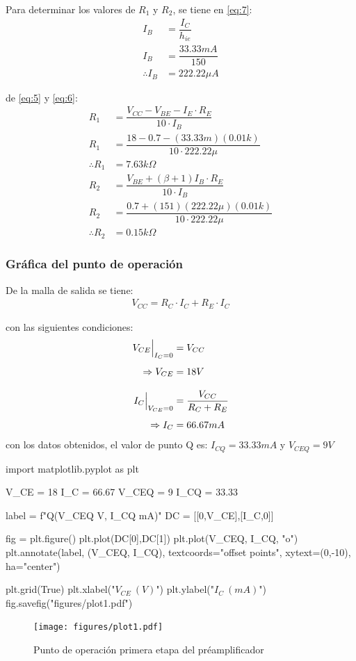 \documentclass[a4paper, 12pt]{article}
\begin{document}
Para determinar los valores de $R_1$ y $R_2$, se tiene en \eqref{eq:7}: 
\begin{align*}
    I_B &= \dfrac{I_C}{h_{ie}}\\[1.5mm]
    I_B &= \dfrac{33.33 mA}{150}\\[1.5mm] 
    \therefore I_B &= 222.22 \mu A
\end{align*}

de \eqref{eq:5} y \eqref{eq:6}:
\begin{align*}
    R_1 &= \dfrac{V_{CC} - V_{BE} -I_E\cdot R_E}{10\cdot I_B}\\[1.5mm]
    R_1 &= \dfrac{18 - 0.7 - (33.33m)(0.01k)}{10\cdot 222.22\mu}\\[1.5mm]
    \therefore R_1 &= 7.63 k\Omega \\[2mm]
    R_2 &= \dfrac{V_{BE} + (\beta + 1)I_B\cdot R_E}{10\cdot I_B}\\[1.5mm]
    R_2 &= \dfrac{0.7 + (151)(222.22\mu)(0.01k)}{10\cdot 222.22\mu}\\[1.5mm]
    \therefore R_2 &= 0.15 k\Omega
\end{align*}

\subsubsection{Gráfica del punto de operación}
De la malla de salida se tiene:
\begin{align}
    V_{CC} = R_C\cdot I_C + R_E\cdot I_C
\end{align}

con las siguientes condiciones:
\begin{align*}
    \Bigl. V_{CE}\Bigr|_{I_C=0} &= V_{CC}\\[1.5mm]
    \Rightarrow V_{CE} &= 18 V \\[3mm]
    \Bigl. I_{C}\Bigr|_{V_{CE}=0} &= \dfrac{V_{CC}}{R_C + R_E}\\[1.5mm]
    \Rightarrow I_{C} &= 66.67 mA
\end{align*}
con los datos obtenidos, el valor de punto Q es: 
$I_{CQ} = 33.33 mA$ y $ V_{CEQ} = 9 V$

\begin{pycode}
import matplotlib.pyplot as plt

V_CE = 18 
I_C = 66.67 
V_CEQ = 9
I_CQ = 33.33

label = f"Q({V_CEQ} V, {I_CQ} mA)"
DC = [[0,V_CE],[I_C,0]]

fig = plt.figure()
plt.plot(DC[0],DC[1])
plt.plot(V_CEQ, I_CQ, "o")
plt.annotate(label, (V_CEQ, I_CQ), 
textcoords="offset points", xytext=(0,-10), ha="center")

plt.grid(True)
plt.xlabel("$V_{CE}\ (V)$")
plt.ylabel("$I_{C}\ (mA)$")
fig.savefig("figures/plot1.pdf")
\end{pycode}
\begin{figure}[H]
    \centering
    \texttt{[image: figures/plot1.pdf]}
    \caption{Punto de operación primera etapa del préamplificador}
\end{figure}
\end{document}
